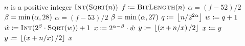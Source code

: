\begin{algorithm}[t]
\caption{Integer Square Root algorithm using floating-point sqrt (improved)}
\label{alg:isqrt_float_2}
\begin{algorithmic}[1]
\Require $n$ is a positive integer
        \State \Return $\textsc{Int}(\textsc{Sqrt}(n))$
    \EndIf
    \State $f \coloneqq{} \textsc{BitLength}(n)$
        \State $\alpha = (f - 52)/2$
        \State $\beta = \min\left( \alpha, 28 \right)$
    \Else
        \State $\alpha = (f - 53)/2$
        \State $\beta = \min\left( \alpha, 27 \right)$
    \EndIf
    \State $q \coloneqq{} \left\lfloor n/2^{2\alpha} \right\rfloor$
    \State $w \coloneqq{} q + 1$
    \State $\hat{w} \coloneqq{} \textsc{Int}(2^{\beta}\cdot\textsc{Sqrt}(w))+1$
        \label{lst:isqrt_float_2_scaled_beta}
    \State $x \coloneqq{} 2^{\alpha-\beta}\cdot\hat{w}$
    \State $y \coloneqq{} \left\lfloor \left( x + n/x \right)/2 \right\rfloor$
        \State $x \coloneqq{} y$
        \State $y \coloneqq{} \left\lfloor \left( x + n/x \right)/2 \right\rfloor$
    \EndWhile
    \State \Return $x$
\EndProcedure
\end{algorithmic}
\end{algorithm}
